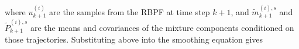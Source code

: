 \documentclass[twocolumn]{autart}    %
\begin{document}
%
where $u_{k+1}^{(i)}$ are the samples from the RBPF at time step $k+1$, and $\tilde{m}_{k+1}^{(i),s}$ and $\tilde{P}_{k+1}^{(i),s}$ are the means and covariances of the mixture components conditioned on those trajectories.
%
%
%
Substituting above into the smoothing equation gives
%
\end{document}
